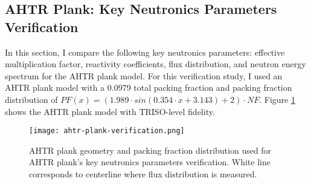 \subsection{AHTR Plank: Key Neutronics Parameters Verification}
In this section, I compare the following key neutronics parameters: effective multiplication 
factor, reactivity coefficients, flux distribution, and neutron energy spectrum for the 
\gls{AHTR} plank model. 
For this verification study, I used an AHTR plank model with a 0.0979 total packing fraction and 
packing fraction distribution of $PF(x) = \left(1.989\cdot sin(0.354\cdot x + 3.143) + 2\right) \cdot NF$. 
Figure \ref{fig:ahtr-plank-verification} shows the AHTR plank model with TRISO-level 
fidelity.
 \begin{figure}[htbp]
    \centering
    \texttt{[image: ahtr-plank-verification.png]}
    \raggedright
    \caption{AHTR plank geometry and packing fraction distribution used for AHTR plank's key 
    neutronics parameters verification. White line corresponds to centerline where 
    flux distribution is measured. }  
    \label{fig:ahtr-plank-verification}
\end{figure}

